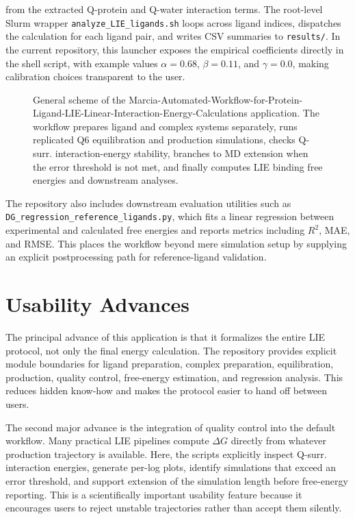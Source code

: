 \documentclass[journal=jcisd8,manuscript=article]{achemso}
\begin{document}
from the extracted Q-protein and Q-water interaction terms. The root-level Slurm wrapper \texttt{analyze\_LIE\_ligands.sh} loops across ligand indices, dispatches the calculation for each ligand pair, and writes CSV summaries to \texttt{results/}. In the current repository, this launcher exposes the empirical coefficients directly in the shell script, with example values \(\alpha = 0.68\), \(\beta = 0.11\), and \(\gamma = 0.0\), making calibration choices transparent to the user.

\begin{figure}[h]
\centering

\caption{General scheme of the Marcia-Automated-Workflow-for-Protein-Ligand-LIE-Linear-Interaction-Energy-Calculations application. The workflow prepares ligand and complex systems separately, runs replicated Q6 equilibration and production simulations, checks Q-surr. interaction-energy stability, branches to MD extension when the error threshold is not met, and finally computes LIE binding free energies and downstream analyses.}
\label{fig:workflow}
\end{figure}

The repository also includes downstream evaluation utilities such as \texttt{DG\_regression\_reference\_ligands.py}, which fits a linear regression between experimental and calculated free energies and reports metrics including \(R^2\), MAE, and RMSE. This places the workflow beyond mere simulation setup by supplying an explicit postprocessing path for reference-ligand validation.

\section{Usability Advances}

The principal advance of this application is that it formalizes the entire LIE protocol, not only the final energy calculation. The repository provides explicit module boundaries for ligand preparation, complex preparation, equilibration, production, quality control, free-energy estimation, and regression analysis. This reduces hidden know-how and makes the protocol easier to hand off between users.

The second major advance is the integration of quality control into the default workflow. Many practical LIE pipelines compute \(\Delta G\) directly from whatever production trajectory is available. Here, the scripts explicitly inspect Q-surr. interaction energies, generate per-log plots, identify simulations that exceed an error threshold, and support extension of the simulation length before free-energy reporting. This is a scientifically important usability feature because it encourages users to reject unstable trajectories rather than accept them silently.
\end{document}
